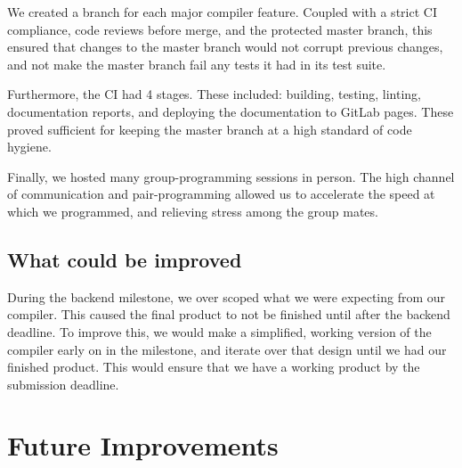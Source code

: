 \documentclass{article}
\begin{document}
        We created a branch for each major compiler feature. Coupled with a strict CI compliance, code reviews before merge, and the protected master branch, this ensured that changes to the master branch would not corrupt previous changes, and not make the master branch fail any tests it had in its test suite.
        
        Furthermore, the CI had 4 stages. These included: building, testing, linting, documentation reports, and deploying the documentation to GitLab pages. These proved sufficient for keeping the master branch at a high standard of code hygiene.
        
        Finally, we hosted many group-programming sessions in person. The high channel of communication and pair-programming allowed us to accelerate the speed at which we programmed, and relieving stress among the group mates.
        
        \subsection*{What could be improved}
        During the backend milestone, we over scoped what we were expecting from our compiler. This caused the final product to not be finished until after the backend deadline. To improve this, we would make a simplified, working version of the compiler early on in the milestone, and iterate over that design until we had our finished product. This would ensure that we have a working product by the submission deadline.

    \section*{Future Improvements}
        
\end{document}
